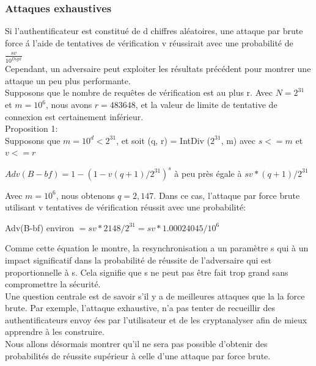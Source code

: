 \documentclass{../res/univ-projet}
\begin{document}
    \subsubsection{Attaques exhaustives}
    Si l'authentificateur est constitu\'{e} de d chiffres al\'{e}atoires, une attaque par brute force \'{a} l'aide de tentatives de v\'{e}rification v r\'{e}ussirait avec 
    une probabilit\'{e} de $\frac{sv}{10^{Digit}}$\\
    Cependant, un adversaire peut exploiter les r\'{e}sultats pr\'{e}c\'{e}dent pour montrer une attaque un peu plus performante.\\
    Supposons que le nombre de requ\^{e}tes de v\'{e}rification est au plus r. Avec $N = 2^{31}$ et $m = 10^6$, nous avons $r = 483648$, et la valeur de limite de 
    tentative de connexion est certainement inférieur.\\
    Proposition 1:\\
    Supposons que $m = 10^d < 2^{31}$, et soit (q, r) = IntDiv ($2^{31}$, m) avec $s <= m$ et $v <= r$\\
    \begin{center}
      $Adv(B-bf) = 1 - (1 - v(q+1)/2^31)^s$ \`{a} peu pr\`{e}s \'{e}gale \`{a}  $sv * (q+1)/2^{31}$\\
    \end{center}
    Avec $m = 10^6$, nous obtenons $q = 2,147$. Dans ce cas, l'attaque par force brute
    utilisant v tentatives de vérification réussit avec une probabilité:\\
    \begin{center}    
      Adv(B-bf) environ $= sv * 2148/2^{31} = sv * 1.00024045/10^6$\\
    \end{center}
    Comme cette équation le montre, la resynchronisation a un paramètre s qui \`{a}
    un impact significatif dans  la probabilit\'{e} de r\'{e}ussite de l'adversaire qui est
    proportionnelle \`{a} s. Cela signifie que s ne peut pas \^{e}tre fait trop grand
    sans compromettre la s\'{e}curit\'{e}.\\
    Une question centrale est de savoir s'il y a de meilleures attaques que la
    la force brute. Par exemple, l'attaque exhaustive, n'a pas tenter de recueillir des authentificateurs envoy \'{e}es par l'utilisateur et de les cryptanalyser afin de 
    mieux apprendre \`{a} les construire.\\
    Nous allons d\'{e}sormais montrer qu'il ne sera pas possible d'obtenir des probabilit\'{e}s de r\'{e}ussite sup\'{e}rieur \`{a} celle d'une attaque par force brute.\\
\end{document}
